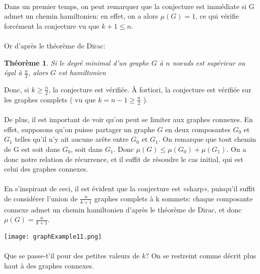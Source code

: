 \documentclass[a4paper]{article}
\newtheorem{theorem}{Théorème}
\theoremstyle{definition}
\theoremstyle{remark}
\begin{document}
\paragraph{}
Dans un premier temps, on peut remarquer que la conjecture est immédiate si G admet un chemin hamiltonien: en effet, on a alors $\mu(G)=1$, ce qui vérifie forcément la conjecture vu que $k+1 \leq n$.

\paragraph{}
Or d'après le théorème de Dirac:
\begin{theorem}
Si le degré minimal d'un graphe $G$ à $n$ noeuds est supérieur ou égal à
$\frac{n}{2}$, alors $G$ est hamiltonien
\end{theorem}


Donc, si $k \geq \frac{n}{2}$, la conjecture est vérifiée. À fortiori, la
conjecture est vérifiée sur les graphes complets ( vu que $k = n-1 \geq \frac{n}{2}$ ).


\paragraph{}
De plus, il est important de voir qu'on peut se limiter aux graphes connexes. En effet, supposons qu'on puisse partager un graphe $G$ en deux composantes
$G_{0}$ et $G_{1}$ telles qu'il n'y ait aucune arête entre $G_{0}$ et $G_{1}$. On remarque que tout chemin de G est soit dans $G_{0}$, soit dans $G_{1}$.
Donc $\mu(G) \leq \mu(G_{0}) + \mu(G_{1})$. On a donc notre relation de
récurrence, et il suffit de résoudre le cas initial, qui est celui des graphes connexes.


\paragraph{}
En s'inspirant de ceci, il est évident que la conjecture est «sharp», puisqu'il suffit de considérer l'union de $\frac{n}{k+1}$ graphes complets à k sommets: chaque composante connexe admet un chemin 
hamiltonien d'après le théorème de Dirac, et donc $\mu(G)=\frac{n}{k+1}$.


\texttt{[image: graphExample11.png]}


\paragraph{}
Que se passe-t'il pour des petites valeurs de $k$? On se restreint comme décrit plus haut à des graphes connexes.
\end{document}

